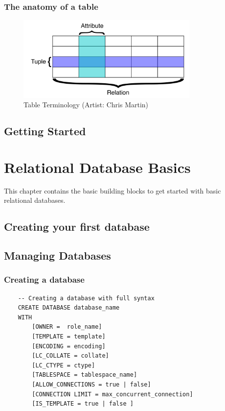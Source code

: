\subsection{The anatomy of a table}

\begin{figure}[h]
    \centering
    \includegraphics[width=0.8\textwidth]{content/1-relational-databases/figures/2.table-definitions.png}
    \caption{Table Terminology (Artist: Chris Martin)}
    \label{fig:2.table-definitions.png}
\end{figure}

\section{Getting Started}


\chapter{Relational Database Basics}
\label{chap:relational:relational-database-basics}
This chapter contains the basic building blocks to get started with basic relational databases.

\section{Creating your first database}

\section{Managing Databases}

\subsection{Creating a database}
\begin{verbatim}
    -- Creating a database with full syntax
    CREATE DATABASE database_name
    WITH
        [OWNER =  role_name]
        [TEMPLATE = template]
        [ENCODING = encoding]
        [LC_COLLATE = collate]
        [LC_CTYPE = ctype]
        [TABLESPACE = tablespace_name]
        [ALLOW_CONNECTIONS = true | false]
        [CONNECTION LIMIT = max_concurrent_connection]
        [IS_TEMPLATE = true | false ]
\end{verbatim}

